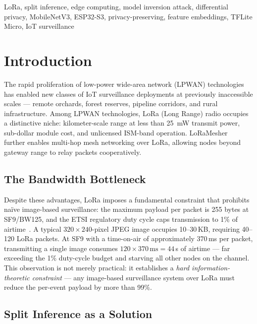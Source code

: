 \documentclass[journal]{IEEEtran}
\begin{document}
\begin{IEEEkeywords}
LoRa, split inference, edge computing, model inversion attack, differential
privacy, MobileNetV3, ESP32-S3, privacy-preserving, feature embeddings,
TFLite Micro, IoT surveillance
\end{IEEEkeywords}

\section{Introduction}
\label{sec:intro}

The rapid proliferation of low-power wide-area network (LPWAN) technologies
has enabled new classes of IoT surveillance deployments at previously
inaccessible scales — remote orchards, forest reserves, pipeline corridors,
and rural infrastructure.
Among LPWAN technologies, LoRa (Long Range) radio occupies a distinctive
niche: kilometer-scale range at less than \SI{25}{mW} transmit power,
sub-dollar module cost, and unlicensed ISM-band operation.
LoRaMesher~\cite{LoRaMesher2023} further enables multi-hop mesh networking
over LoRa, allowing nodes beyond gateway range to relay packets cooperatively.

\subsection{The Bandwidth Bottleneck}

Despite these advantages, LoRa imposes a fundamental constraint that
prohibits naïve image-based surveillance: the maximum payload per packet
is 255 bytes at SF9/BW125, and the ETSI regulatory duty cycle caps
transmission to 1\% of airtime~\cite{LoRaSpec2015}.
A typical $320\times240$-pixel JPEG image occupies 10--30\,KB,
requiring 40--120 LoRa packets.
At SF9 with a time-on-air of approximately 370\,ms per packet,
transmitting a single image consumes $120 \times 370\,\text{ms} = 44$\,s
of airtime --- far exceeding the 1\% duty-cycle budget and starving all
other nodes on the channel.
This observation is not merely practical: it establishes a \emph{hard
information-theoretic constraint} --- any image-based surveillance system
over LoRa must reduce the per-event payload by more than 99\%.

\subsection{Split Inference as a Solution}
\end{document}
